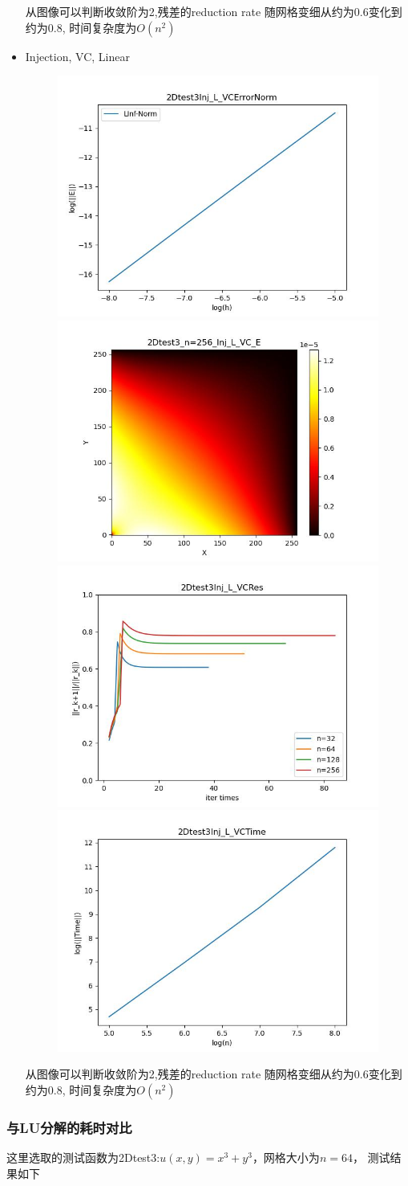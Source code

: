 \documentclass{article}
\begin{document}
\begin{itemize}
    从图像可以判断收敛阶为2,残差的reduction rate 随网格变细从约为0.6变化到约为0.8, 时间复杂度为$O(n^2)$
    \newpage
    \item Injection, VC, Linear
    \begin{figure}[h]
        \centering
        \includegraphics[width=0.35\linewidth]{2Dtest3Inj_L_VCErrorNorm.jpg}
        \includegraphics[width=0.35\linewidth]{2Dtest3_n=256_Inj_L_VC_E.jpg}
        \includegraphics[width=0.35\linewidth]{2Dtest3Inj_L_VCRes.jpg}
        \includegraphics[width=0.35\linewidth]{2Dtest3Inj_L_VCTime.jpg}
    \end{figure}
    
    从图像可以判断收敛阶为2,残差的reduction rate 随网格变细从约为0.6变化到约为0.8, 时间复杂度为$O(n^2)$
\end{itemize}

\subsubsection{与LU分解的耗时对比}
这里选取的测试函数为2Dtest3:$u(x,y)=x^3+y^3$，网格大小为$n=64$，
测试结果如下
\end{document}
